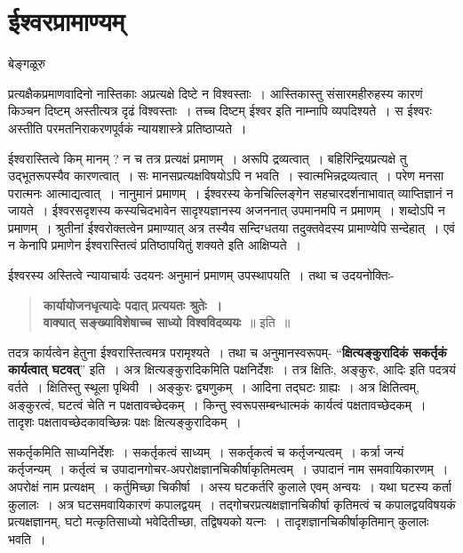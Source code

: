 {\fontsize{15}{17}\selectfont
\presetvalues
\chapter{ईश्वरप्रामाण्यम्}

\begin{center}
\smallskip
बेङ्गळूरु
\addrule
\end{center}
प्रत्यक्षैकप्रमाणवादिनो नास्तिकाः अप्रत्यक्षे दिष्टे न विश्वस्ताः~। आस्तिकास्तु संसारमहीरुहस्य कारणं किञ्चन दिष्टम् अस्तीत्यत्र दृढं विश्वस्ताः~। तच्च दिष्टम् ईश्वर इति नाम्नापि व्यपदिश्यते~। स ईश्वरः अस्तीति परमतनिराकरणपूर्वकं न्यायशास्त्रे प्रतिष्ठाप्यते~। 

ईश्वरास्तित्वे किम् मानम् ? न च तत्र प्रत्यक्षं प्रमाणम्~। अरूपि द्रव्यत्वात्~। बहिरिन्द्रियप्रत्यक्षे तु उद्भूतरूपस्यैव कारणत्वात्~। सः मानसप्रत्यक्षविषयोऽपि न भवति~। स्वात्मभिन्नद्रव्यत्वात्~। परेण मनसा परात्मनः आत्माद्यत्वात्~। नानुमानं प्रमाणम्~। ईश्वरस्य केनचिल्लिङ्गेन सहचारदर्शनाभावात् व्याप्तिज्ञानं न जायते~। ईश्वरसदृशस्य कस्यचिदभावेन सादृश्यज्ञानस्य अजननात् उपमानमपि न प्रमाणम्~। शब्दोऽपि न प्रमाणम्~। श्रुतीनां ईश्वरोक्तत्वेन प्रमाण्यात् अत्र तस्यैव सन्दिग्धतया तदुक्तवेदस्य प्रामाण्येपि सन्देहात्~। एवं न केनापि प्रमाणेन ईश्वरास्तित्वं प्रतिष्ठापयितुं शक्यते इति आक्षिप्यते~। 

ईश्वरस्य अस्तित्वे न्यायाचार्यः उदयनः अनुमानं प्रमाणम् उपस्थापयति~। तथा च उदयनोक्तिः-
\begin{verse}
\textbf{कार्यायोजनधृत्यादेः पदात् प्रत्ययतः श्रुतेः~। \\
वाक्यात् सङ्ख्याविशेषाच्च साध्यो विश्वविदव्ययः}~॥ इति~॥
\end{verse}
तदत्र कार्यत्वेन हेतुना ईश्वरास्तित्वमत्र परामृश्यते~। तथा च अनुमानस्वरूपम्- “\textbf{क्षित्यङ्कुरादिकं सकर्तृकं कार्यत्वात् घटवत्}” इति~। अत्र क्षित्यङ्कुरादिकमिति पक्षनिर्देशः~। तत्र क्षितिः, अङ्कुरः, आदिः इति पदत्रयं वर्तते~। क्षितिस्तु स्थूला पृथिवी~। अङ्कुरः द्व्यणुकम्~। आदिना तद्घटः ग्राह्यः~। अत्र क्षितित्वम्, अङ्कुरत्वं, घटत्वं चेति न पक्षतावच्छेदकम्~। किन्तु स्वरूपसम्बन्धात्मकं कार्यत्वं पक्षतावच्छेदकम्~। तादृशः पक्षतावच्छेदकावच्छिन्नः पक्षः क्षित्यङ्कुरादिकम्~। 

सकर्तृकमिति साध्यनिर्देशः~। सकर्तृकत्वं साध्यम्~। सकर्तृकत्वं च कर्तृजन्यत्वम्~। कर्त्रा जन्यं कर्तृजन्यम्~। कर्तृत्वं च उपादानगोचर-अपरोक्षज्ञानचिकीर्षाकृतिमत्वम्~। उपादानं नाम समवायिकारणम्~। अपरोक्षं नाम प्रत्यक्षम्~। कर्तुमिच्छा चिकीर्षा~। अस्य घटकर्तरि कुलाले एवम् अन्वयः~। यथा घटस्य कर्ता कुलालः~। अत्र घटसमवायिकारणं कपालद्वयम्~। तद्गोचरप्रत्यक्षज्ञानचिकीर्षा कृतिमत्वं च कपालद्वयविषयकं प्रत्यक्षज्ञानम्, घटो मत्कृतिसाध्यो भवेदितीच्छा, तद्विषयको यत्नः~। तादृशज्ञानचिकीर्षाकृतिमान् कुलालः भवति~। 

}

